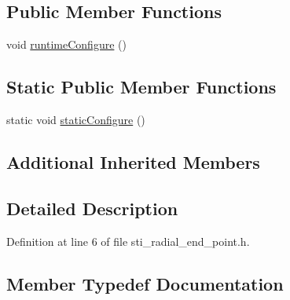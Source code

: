 \subsection*{Public Member Functions}
\begin{DoxyCompactItemize}
\item 
void \hyperlink{structsm__dance__bot__2_1_1radial__motion__states_1_1StiRadialEndPoint_a2344eeef3dee9a2b1bb4956e9cbd4639}{runtime\+Configure} ()
\end{DoxyCompactItemize}
\subsection*{Static Public Member Functions}
\begin{DoxyCompactItemize}
\item 
static void \hyperlink{structsm__dance__bot__2_1_1radial__motion__states_1_1StiRadialEndPoint_af1716c7c5ffb71659603d18d9c29bd89}{static\+Configure} ()
\end{DoxyCompactItemize}
\subsection*{Additional Inherited Members}


\subsection{Detailed Description}


Definition at line 6 of file sti\+\_\+radial\+\_\+end\+\_\+point.\+h.



\subsection{Member Typedef Documentation}
\mbox{\label{structsm__dance__bot__2_1_1radial__motion__states_1_1StiRadialEndPoint_ab1c4077f375f1baaec5de4b81b1ef7e7}} 
